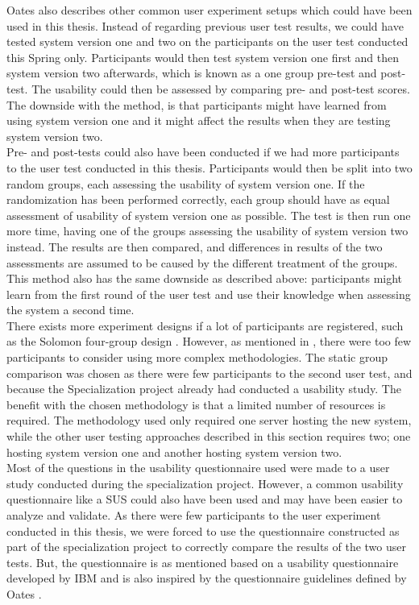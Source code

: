 Oates also describes other common user experiment setups which could have been used in this thesis. Instead of regarding previous user test results, we could have tested system version one and two on the participants on the user test conducted this Spring only. Participants would then test system version one first and then system version two afterwards, which is known as a one group pre-test and post-test. The usability could then be assessed by comparing pre- and post-test scores. The downside with the method, is that participants might have learned from using system version one and it might affect the results when they are testing system version two. \\

Pre- and post-tests could also have been conducted if we had more participants to the user test conducted in this thesis. Participants would then be split into two random groups, each assessing the usability of system version one. If the randomization has been performed correctly, each group should have as equal assessment of usability of system version one as possible. The test is then run one more time, having one of the groups assessing the usability of system version two instead. The results are then compared, and differences in results of the two assessments are assumed to be caused by the different treatment of the groups. This method also has the same downside as described above: participants might learn from the first round of the user test and use their knowledge when assessing the system a second time. \\

There exists more experiment designs if a lot of participants are registered, such as the Solomon four-group design \cite{Oates2006}. However, as mentioned in , there were too few participants to consider using more complex methodologies. The static group comparison was chosen as there were few participants to the second user test, and because the Specialization project already had conducted a usability study. The benefit with the chosen methodology is that a limited number of resources is required. The methodology used only required one server hosting the new system, while the other user testing approaches described in this section requires two; one hosting system version one and another hosting system version two. \\

Most of the questions in the usability questionnaire used were made to a user study conducted during the specialization project. However, a common usability questionnaire like a SUS \cite{brooke1996} could also have been used and may have been easier to analyze and validate. As there were few participants to the user experiment conducted in this thesis, we were forced to use the questionnaire constructed as part of the specialization project to correctly compare the results of the two user tests. But, the questionnaire is as mentioned based on a usability questionnaire developed by IBM and is also inspired by the questionnaire guidelines defined by Oates \cite{Oates2006}. \\

